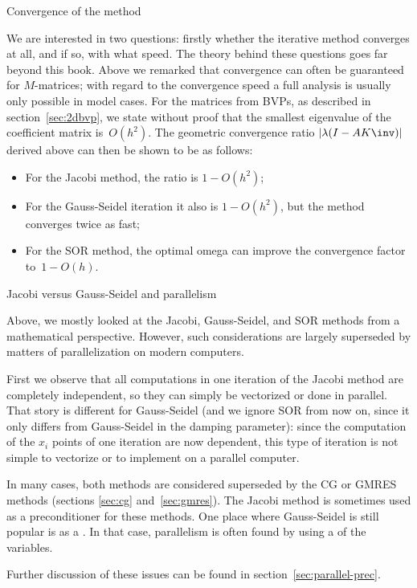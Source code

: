  {Convergence of the method}

We are interested in two questions: firstly whether the iterative
method converges at all, and if so, with what speed.  The theory
behind these questions goes far beyond this book. Above we remarked
that convergence can often be guaranteed for $M$-matrices; with regard to
the convergence speed a full analysis is usually only possible in
model cases. For the matrices from \acp{BVP}, as described in
section~\ref{sec:2dbvp}, we state without proof that the smallest
eigenvalue of the coefficient matrix is~$O(h^2)$. The geometric
convergence ratio $|\lambda(I-AK\inv)|$ derived above can then be
shown to be as follows:
\begin{itemize}
\item For the Jacobi method, the ratio is $1-O(h^2)$;
\item For the Gauss-Seidel iteration it also is $1-O(h^2)$, but the
  method converges twice as fast;
\item For the SOR method, the optimal omega can improve the
  convergence factor to~$1-O(h)$.
\end{itemize}

 {Jacobi versus Gauss-Seidel and parallelism}

Above, we mostly looked at the Jacobi, Gauss-Seidel, and SOR methods
from a mathematical perspective.
However, such considerations are largely superseded by matters
of parallelization on modern computers.

First we observe that all computations in one iteration of the Jacobi
method are completely independent, so they can simply be vectorized or
done in parallel. That story is different for Gauss-Seidel (and we
ignore SOR from now on, since it only differs from Gauss-Seidel in the
damping  parameter):
since the computation of the
$x_i$ points of one iteration are now dependent, this type of
iteration is not simple
to vectorize or
to implement on a parallel computer.

In many cases, both methods are considered superseded by the \ac{CG}
or \ac{GMRES} methods (sections \ref{sec:cg} and~\ref{sec:gmres}). The
Jacobi method is sometimes used as a preconditioner for these methods.
One place where Gauss-Seidel is still popular is as a
. In that case, parallelism is often
found by using a  of the variables.

Further discussion of these issues can be found in section~\ref{sec:parallel-prec}.

